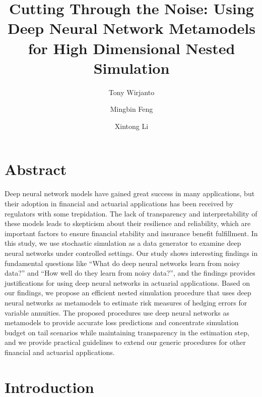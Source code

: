 \documentclass{article}
\title{Cutting Through the Noise: Using Deep Neural Network Metamodels for High Dimensional Nested Simulation}
\author{Tony Wirjanto \and Mingbin Feng \and Xintong Li}
\date{}
\begin{document}
\maketitle

\section*{Abstract}

Deep neural network models have gained great success in many applications, but their adoption in financial and actuarial applications has been received by regulators with some trepidation.
The lack of transparency and interpretability of these models leads to skepticism about their resilience and reliability, which are important factors to ensure financial stability and insurance benefit fulfillment.
In this study, we use stochastic simulation as a data generator to examine deep neural networks under controlled settings.
Our study shows interesting findings in fundamental questions like ``What do deep neural networks learn from noisy data?'' and ``How well do they learn from noisy data?'', and the findings provides justifications for using deep neural networks in actuarial applications.
Based on our findings, we propose an efficient nested simulation procedure that uses deep neural networks as metamodels to estimate risk measures of hedging errors for variable annuities.
The proposed procedures use deep neural networks as metamodels to provide accurate loss predictions and concentrate simulation budget on tail scenarios while maintaining transparency in the estimation step, and we provide practical guidelines to extend our generic procedures for other financial and actuarial applications.

\section{Introduction}
\end{document}
